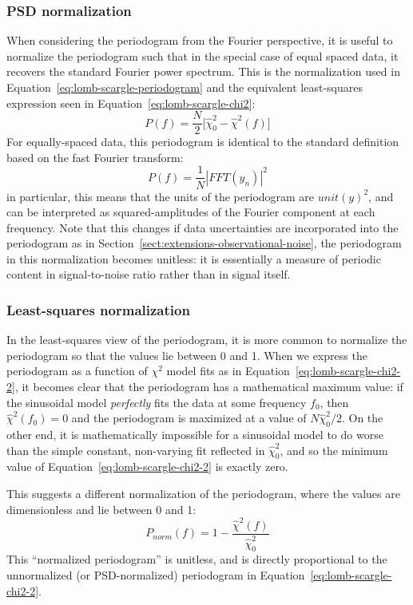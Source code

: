 \documentclass[preprint]{aastex}
\newcommand{\Eq}[1]{Equation~\ref{eq:#1}}
\newcommand{\eq}[1]{\Eq{#1}}
\newcommand{\eqlabel}[1]{\label{eq:#1}}
\newcommand{\Sect}[1]{Section~\ref{sect:#1}}
\newcommand{\sect}[1]{\Sect{#1}}
\begin{document}
\subsubsection{PSD normalization}
When considering the periodogram from the Fourier perspective,
it is useful to normalize the periodogram such that in the special case
of equal spaced data, it recovers the standard Fourier power spectrum.
This is the normalization used in \eq{lomb-scargle-periodogram} and the
equivalent least-squares expression seen in \eq{lomb-scargle-chi2}:
\begin{equation}
  P(f) = \frac{N}{2}\big[\hat{\chi}^2_0 - \hat{\chi}^2(f)\big]
  \eqlabel{lomb-scargle-chi2-2}
\end{equation}
For equally-spaced data, this periodogram is identical to the standard
definition based on the fast Fourier transform:
\begin{equation}
  P(f) = \frac{1}{N} \left| FFT(y_n) \right|^2
\end{equation}
in particular, this means that the units of the periodogram are $unit(y)^2$,
and can be interpreted as squared-amplitudes of the Fourier component at
each frequency.
Note that this changes if data uncertainties are incorporated into
the periodogram as in \sect{extensions-observational-noise},
the periodogram in this normalization becomes unitless: it is essentially
a measure of periodic content in signal-to-noise ratio
rather than in signal itself.

\subsubsection{Least-squares normalization}
In the least-squares view of the periodogram, it is more common to normalize
the periodogram so that the values lie between 0 and 1.
When we express the periodogram as a function of $\chi^2$ model fits as in
\eq{lomb-scargle-chi2-2}, it becomes clear that the periodogram has a
mathematical maximum value: if the sinusoidal model {\it perfectly} fits
the data at some frequency $f_0$, then $\hat{\chi}^2(f_0) = 0$ and the
periodogram is maximized at a value of $N\hat{\chi}^2_0 / 2$.
On the other end, it is mathematically impossible for a sinusoidal model to
do worse than the simple constant, non-varying fit reflected in
$\hat{\chi}^2_0$, and so the minimum value of \eq{lomb-scargle-chi2-2} is
exactly zero.

This suggests a different normalization of the periodogram, where the values
are dimensionless and lie between 0 and 1:
\begin{equation}
  P_{norm}(f) = 1 - \frac{\hat{\chi}^2(f)}{\hat{\chi}^2_0}
  \eqlabel{lomb-scargle-normalized}
\end{equation}
This ``normalized periodogram'' is unitless, and
is directly proportional to the unnormalized
(or PSD-normalized) periodogram in \eq{lomb-scargle-chi2-2}.
\end{document}
